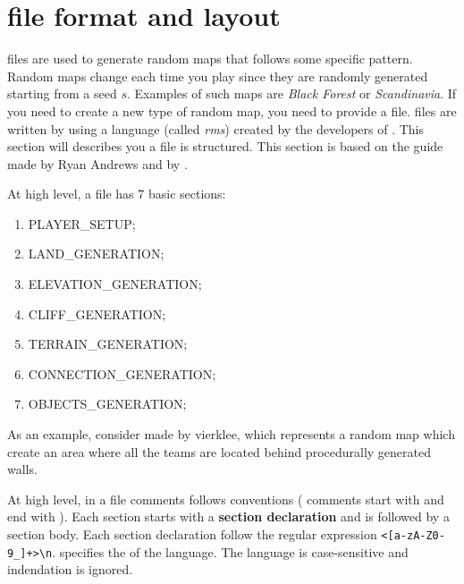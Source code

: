 \chapter{ file format and layout}
    \label{chp:rms}

     files are used to generate random maps that follows some specific pattern. Random maps change each time you play since they are randomly generated starting from a seed $s$. Examples of such maps are \textit{Black Forest} or \textit{Scandinavia}. 
    If you need to create a new type of random map, you need to provide a  file.  files are written by using a language (called \textit{rms}) created by the developers of \aoe{}\cite{rms:2019}. This section will describes you a  file is structured. This section is based on the guide made by Ryan Andrews\cite{rms:2019} and by \cite{zetnus:2019}.

    At high level, a  file has 7 basic sections:
    
    \begin{enumerate}
        \item PLAYER\_SETUP;
        \item LAND\_GENERATION;
        \item ELEVATION\_GENERATION;
        \item CLIFF\_GENERATION;
        \item TERRAIN\_GENERATION;
        \item CONNECTION\_GENERATION;
        \item OBJECTS\_GENERATION;
    \end{enumerate}

    As an example, consider  made by vierklee, which represents a random map which create an area where all the teams are located behind procedurally generated walls.

    

    At high level, in a  file comments follows  conventions (\ie{} comments start with \dquote{/* } and end with \dquote{ */}). Each section starts with a \textbf{section declaration} and is followed by a section body. Each section declaration follow the regular expression \verb|<[a-zA-Z0-9_]+>\n|.  specifies the  of the  language. The language is case-sensitive and indendation is ignored\cite{zetnus:2019}.

